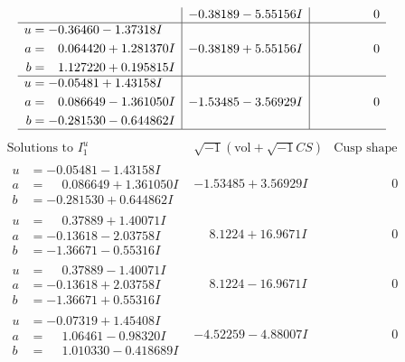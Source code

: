 \documentclass[1p]{elsarticle_modified}
\theoremstyle{definition}
\newcommand{\I}{\sqrt{-1}}
\begin{document}
$$\begin{array}{c|c|c}
 & -0.38189 - 5.55156 I & \phantom{-0.000000 } 0 \\ \hline\begin{aligned}
u &= -0.36460 - 1.37318 I \\
a &= \phantom{-}0.064420 + 1.281370 I \\
b &= \phantom{-}1.127220 + 0.195815 I\end{aligned}
 & -0.38189 + 5.55156 I & \phantom{-0.000000 } 0 \\ \hline\begin{aligned}
u &= -0.05481 + 1.43158 I \\
a &= \phantom{-}0.086649 - 1.361050 I \\
b &= -0.281530 - 0.644862 I\end{aligned}
 & -1.53485 - 3.56929 I & \phantom{-0.000000 } 0\\
 \hline 
 \end{array}$$\newpage$$\begin{array}{c|c|c}  
\text{Solutions to }I^u_{1}& \I (\text{vol} + \sqrt{-1}CS) & \text{Cusp shape}\\
 \hline 
\begin{aligned}
u &= -0.05481 - 1.43158 I \\
a &= \phantom{-}0.086649 + 1.361050 I \\
b &= -0.281530 + 0.644862 I\end{aligned}
 & -1.53485 + 3.56929 I & \phantom{-0.000000 } 0 \\ \hline\begin{aligned}
u &= \phantom{-}0.37889 + 1.40071 I \\
a &= -0.13618 - 2.03758 I \\
b &= -1.36671 - 0.55316 I\end{aligned}
 & \phantom{-}8.1224 + 16.9671 I & \phantom{-0.000000 } 0 \\ \hline\begin{aligned}
u &= \phantom{-}0.37889 - 1.40071 I \\
a &= -0.13618 + 2.03758 I \\
b &= -1.36671 + 0.55316 I\end{aligned}
 & \phantom{-}8.1224 - 16.9671 I & \phantom{-0.000000 } 0 \\ \hline\begin{aligned}
u &= -0.07319 + 1.45408 I \\
a &= \phantom{-}1.06461 - 0.98320 I \\
b &= \phantom{-}1.010330 - 0.418689 I\end{aligned}
 & -4.52259 - 4.88007 I & \phantom{-0.000000 } 0 \\ \hline\begin{aligned}

\end{aligned}
\end{array}$$
\end{document}
